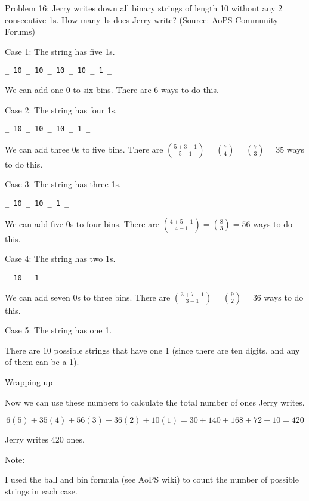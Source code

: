 Problem 16: Jerry writes down all binary strings of length 10 without any 2 consecutive 1s. How many 1s does Jerry write? (Source: AoPS Community Forums)

Case 1: The string has five 1s.

\begin{verbatim}_ 10 _ 10 _ 10 _ 10 _ 1 _\end{verbatim}

We can add one 0 to six bins. There are $\boxed{6}$ ways to do this.

Case 2: The string has four 1s.

\begin{verbatim}_ 10 _ 10 _ 10 _ 1 _\end{verbatim}

We can add three 0s to five bins. There are $\displaystyle {5 + 3 - 1 \choose 5 - 1} = {7 \choose 4} = {7 \choose 3} = \boxed{35}$ ways to do this.

Case 3: The string has three 1s.

\begin{verbatim}_ 10 _ 10 _ 1 _\end{verbatim}

We can add five 0s to four bins. There are $\displaystyle {4 + 5 - 1 \choose 4 - 1} = {8 \choose 3} = \boxed{56}$ ways to do this.

Case 4: The string has two 1s.

\begin{verbatim}_ 10 _ 1 _\end{verbatim}

We can add seven 0s to three bins. There are $\displaystyle {3 + 7 - 1 \choose 3 - 1} = {9 \choose 2} =  \boxed{36}$ ways to do this.

Case 5: The string has one 1.

There are $\boxed{10}$ possible strings that have one 1 (since there are ten digits, and any of them can be a 1).

Wrapping up

Now we can use these numbers to calculate the total number of ones Jerry writes.

\[ 6(5) + 35(4) + 56(3) + 36(2) + 10(1) = 30 + 140 + 168 + 72 + 10 = 420 \]

Jerry writes $\boxed{420}$ ones.

Note:

I used the ball and bin formula (see AoPS wiki) to count the number of possible strings in each case.
